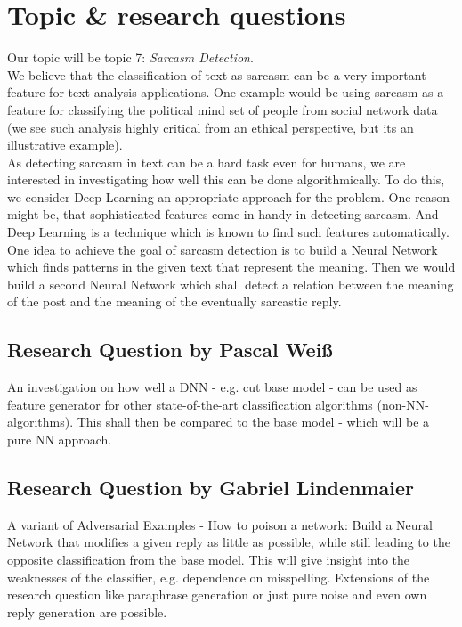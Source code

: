 \documentclass[utf8, english]{lni}
\begin{document}
\section{Topic \& research questions}   %
Our topic will be topic 7: \emph{Sarcasm Detection}.\\

We believe that the classification of text as sarcasm can be a very important feature for text analysis applications. One example would be using sarcasm as a feature for classifying the political mind set of people from social network data (we see such analysis highly critical from an ethical perspective, but its an illustrative example).\\  
As detecting sarcasm in text can be a hard task even for humans, we are interested in investigating how well this can be done algorithmically. To do this, we consider Deep Learning an appropriate approach for the problem. One reason might be, that sophisticated features come in handy in detecting sarcasm. And Deep Learning is a technique which is known to find such features automatically.\\
One idea to achieve the goal of sarcasm detection is to build a Neural Network which finds patterns in the given text that represent the meaning. Then we would build a second Neural Network which shall detect a relation between the meaning of the post and the meaning of the eventually sarcastic reply.

\subsection{Research Question by Pascal Weiß}
An investigation on how well a DNN - e.g. cut base model - can be used as feature generator for other state-of-the-art classification algorithms (non-NN-algorithms). This shall then be compared to the base model - which will be a pure NN approach.

\subsection{Research Question by Gabriel Lindenmaier}
A variant of Adversarial Examples - How to poison a network:
Build a Neural Network that modifies a given reply as little as possible, while still leading to the opposite classification from the base model. This will give insight into the weaknesses of the classifier, e.g. dependence on misspelling. Extensions of the research question like paraphrase generation or just pure noise and even own reply generation are possible.
\end{document}
